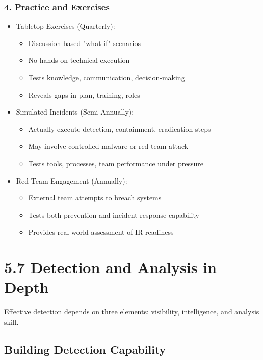 \documentclass[10pt]{article}
\begin{document}
\subsubsection*{4. Practice and Exercises}
\begin{itemize}
  \item Tabletop Exercises (Quarterly):
  \begin{itemize}
  	\item Discussion-based "what if" scenarios
  	\item No hands-on technical execution
  	\item Tests knowledge, communication, decision-making
  	\item Reveals gaps in plan, training, roles
  \end{itemize}
  \item Simulated Incidents (Semi-Annually):
  \begin{itemize}
  	\item Actually execute detection, containment, eradication steps
  	\item May involve controlled malware or red team attack
  	\item Tests tools, processes, team performance under pressure
  \end{itemize}
  \item Red Team Engagement (Annually):
  \begin{itemize}
  	\item External team attempts to breach systems
  	\item Tests both prevention and incident response capability
  	\item Provides real-world assessment of IR readiness
  \end{itemize}
\end{itemize}

\section*{5.7 Detection and Analysis in Depth}
Effective detection depends on three elements: visibility, intelligence, and analysis skill.

\subsection*{Building Detection Capability}
\end{document}
